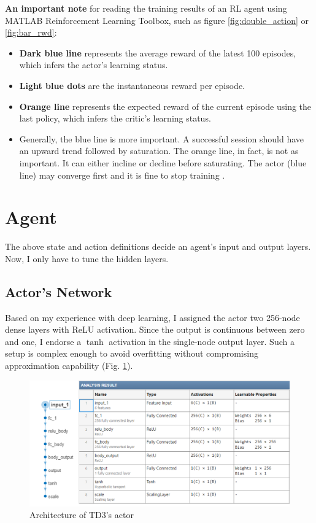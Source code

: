\documentclass[../main.tex]{subfiles}
\begin{document}
\textbf{An important note} for reading the training results of an RL agent using MATLAB Reinforcement Learning Toolbox, such as figure \ref{fig:double_action} or \ref{fig:bar_rwd}:
\begin{itemize}
    \item \textbf{Dark blue line} represents the average reward of the latest 100 episodes, which infers the actor's learning status.
    \item \textbf{Light blue dots} are the instantaneous reward per episode.
    \item \textbf{Orange line} represents the expected reward of the current episode using the last policy, which infers the critic's learning status.
    \item Generally, the blue line is more important. A successful session should have an upward trend followed by saturation. The orange line, in fact, is not as important. It can either incline or decline before saturating. The actor (blue line) may converge first and it is fine to stop training \cite{matlab_q0_support}.
\end{itemize}

\section{Agent} \label{sec:agent}
The above state and action definitions decide an agent's input and output layers. Now, I only have to tune the hidden layers.

\subsection{Actor's Network}
Based on my experience with deep learning, I assigned the actor two 256-node dense layers with ReLU activation. Since the output is continuous between zero and one, I endorse a $\tanh$ activation in the single-node output layer. Such a setup is complex enough to avoid overfitting without compromising approximation capability (Fig. \ref{fig:actor}).
\begin{figure}[htbp]
    \centering
    \includegraphics[width=1\linewidth]{figures/actor_network.png}
    \caption{Architecture of TD3's actor}
    \label{fig:actor}
\end{figure}
\end{document}

